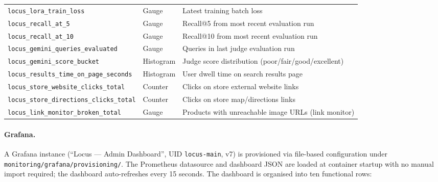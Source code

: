 \documentclass[12pt]{article}
\begin{document}
\begin{longtable}{@{} >{\RaggedRight\arraybackslash}p{7.5cm} >{\RaggedRight\arraybackslash}p{1.5cm} >{\RaggedRight\arraybackslash}p{6.0cm} @{}}
\texttt{locus\_lora\_train\_loss}              & Gauge     & Latest training batch loss \\
\texttt{locus\_recall\_at\_5}               & Gauge     & Recall@5 from most recent evaluation run \\
\texttt{locus\_recall\_at\_10}              & Gauge     & Recall@10 from most recent evaluation run \\
\texttt{locus\_gemini\_queries\_evaluated}   & Gauge     & Queries in last judge evaluation run \\
\texttt{locus\_gemini\_score\_bucket}        & Histogram & Judge score distribution (poor/fair/good/excellent) \\
\texttt{locus\_results\_time\_on\_page\_seconds} & Histogram & User dwell time on search results page \\
\texttt{locus\_store\_website\_clicks\_total}& Counter   & Clicks on store external website links \\
\texttt{locus\_store\_directions\_clicks\_total}& Counter & Clicks on store map/directions links \\
\texttt{locus\_link\_monitor\_broken\_total} & Gauge     & Products with unreachable image URLs (link monitor) \\
\end{longtable}

\paragraph{Grafana.}
A Grafana instance (``Locus --- Admin Dashboard'', UID \texttt{locus-main}, v7) is provisioned via file-based configuration under \texttt{monitoring/grafana/provisioning/}. The Prometheus datasource and dashboard JSON are loaded at container startup with no manual import required; the dashboard auto-refreshes every 15 seconds. The dashboard is organised into ten functional rows:
\end{document}
